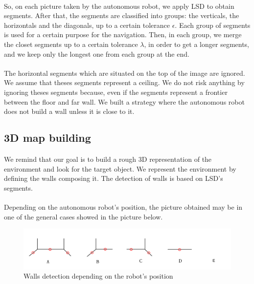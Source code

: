 \documentclass[12pt]{report}
\begin{document}
  \paragraph{}
  So, on each picture taken by the autonomous robot, we apply LSD to obtain segments. After that, the segments are classified into groups: the verticals, the horizontals and the diagonals, up to a certain tolerance $\epsilon$. Each group of segments is used for a certain purpose for the navigation. Then, in each group, we merge the closet segments up to a certain tolerance $\lambda$, in order to get a longer segments, and we keep only the longest one from each group at the end. 
  
\paragraph{}
The horizontal segments which are situated on the top of the image are ignored. We assume that theses segments represent a ceiling. We do not risk anything by ignoring theses segments because, even if the segments represent a frontier between the floor and far wall. We built a strategy where the autonomous robot does not build a wall unless it is close to it.
    \subsection{3D map building}
    
    \paragraph{}
    We remind that our goal is to build a rough 3D representation of the environment and look for the target object. We represent the environment by defining the walls composing it. The detection of walls is based on LSD's segments.
    
    \paragraph{}
    Depending on the autonomous robot's position, the picture obtained may be in one of the general cases showed in the picture below. 
    
    
    	\begin{figure}[H]
    	\begin{center}
    		\includegraphics[scale=0.65]{res/cases_seg.png}
    		\caption{Walls detection depending on the robot's position}
    	\end{center}
    \end{figure}
\end{document}
